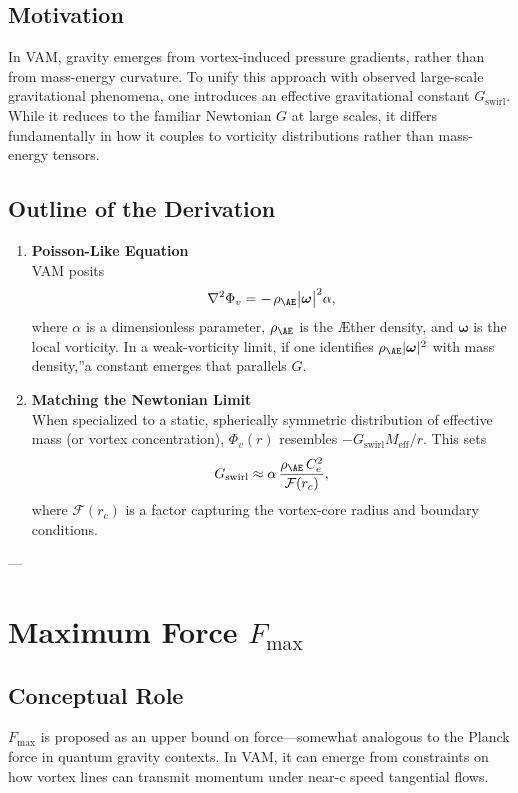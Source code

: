 \subsection{Motivation}
In VAM, gravity emerges from vortex-induced pressure gradients, rather than from mass-energy curvature. To unify this approach with observed large-scale gravitational phenomena, one introduces an effective gravitational constant \(G_\text{swirl}\). While it reduces to the familiar Newtonian \(G\) at large scales, it differs fundamentally in how it couples to vorticity distributions rather than mass-energy tensors.

\subsection{Outline of the Derivation}
\begin{enumerate}
    \item \textbf{Poisson-Like Equation} \\
    VAM posits
    \[
        \nabla^2 \Phi_v    =  -\,\rho_{\mathrm{\AE}}\bigl|\boldsymbol{\omega}\bigr|^2  \alpha,
    \]
    where \(\alpha\) is a dimensionless parameter, \(\rho_{\mathrm{\AE}}\) is the Æther density, and \(\boldsymbol{\omega}\) is the local vorticity. In a weak-vorticity limit, if one identifies \(\rho_{\mathrm{\AE}} |\boldsymbol{\omega}|^2\) with \grqq mass density,\textquotedblright a constant emerges that parallels \(G\).

    \item \textbf{Matching the Newtonian Limit} \\
    When specialized to a static, spherically symmetric distribution of effective mass (or vortex concentration), \(\Phi_v(r)\) resembles \(-G_\text{swirl} M_\text{eff}/r\). This sets
    \[
        G_\text{swirl}     \approx     \alpha \,\frac{\rho_{\mathrm{\AE}}\,C_e^2}{\mathcal{F}(r_c)},
    \]
    where \(\mathcal{F}(r_c)\) is a factor capturing the vortex-core radius and boundary conditions.
\end{enumerate}

---

\section{Maximum Force \(F_{\max}\)}

\subsection{Conceptual Role}
\(F_{\max}\) is proposed as an upper bound on force—somewhat analogous to the Planck force in quantum gravity contexts. In VAM, it can emerge from constraints on how vortex lines can transmit momentum under near-c speed tangential flows.

